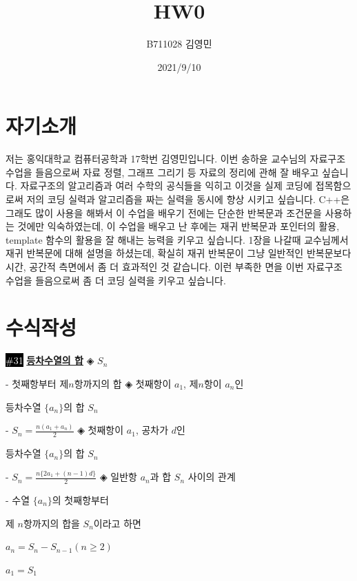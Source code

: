 \documentclass{article}
\title{HW0}
\author{B711028 김영민}
\date{2021/9/10}
\begin{document}
	
	\maketitle
	
\section{자기소개}

	저는 홍익대학교 컴퓨터공학과 17학번 김영민입니다. 이번 송하윤 교수님의 자료구조 수업을 들음으로써 자료 정렬, 그래프 그리기 등 자료의 정리에 관해 잘 배우고 싶습니다. 자료구조의 알고리즘과 여러 수학의 공식들을 익히고 이것을 실제 코딩에 접목함으로써 저의 코딩 실력과 알고리즘을 짜는 실력을 동시에 향상 시키고 싶습니다. C++은 그래도 많이 사용을 해봐서 이 수업을 배우기 전에는 단순한 반복문과 조건문을 사용하는 것에만 익숙하였는데, 이 수업을 배우고 난 후에는 재귀 반복문과 포인터의 활용, template 함수의 활용을 잘 해내는 능력을 키우고 싶습니다. 1장을 나갈때 교수님께서 재귀 반복문에 대해 설명을 하셨는데, 확실히 재귀 반복문이 그냥 일반적인 반복문보다 시간, 공간적 측면에서 좀 더 효과적인 것 같습니다. 이런 부족한 면을 이번 자료구조 수업을 들음으로써 좀 더 코딩 실력을 키우고 싶습니다.
	\vspace{2em}	
\section{수식작성}
	\colorbox{black}{\textcolor{white}{\#31}}  \underline{\textbf{등차수열의 합}}\newline
◈ $ S_n $
\vspace{0.1em}
\setlength{\parindent}{2ex}\par

- 첫째항부터 제$n$항까지의 합\newline
◈  첫째항이 $ a_1 $, 제$n$항이 $ a_n $인

\setlength{\parindent}{3ex}\par 등차수열 $\{ a_n\} $의 합 $ S_n $
\setlength{\parindent}{2ex}\par\vspace{0.1em}
- $S_n  = \frac{n(a_1 + a_n)}{2} $\newline
◈  첫째항이 $ a_1 $, 공차가 $ d $인

\setlength{\parindent}{3ex}\par 등차수열 $\{a_n\}$의 합 $S_n$
\setlength{\parindent}{2ex}\par\vspace{0.1em}
- $S_n  = \frac{n\{2a_1 + (n-1)d\}}{2} $\newline
◈  일반항 $a_n$과 합 $S_n$ 사이의 관계
\setlength{\parindent}{2ex}\par
- 수열 $\{a_n\}$의 첫째항부터
\setlength{\parindent}{3ex}\par
제 $n$항까지의 합을 $S_n$이라고 하면
\setlength{\parindent}{3ex}\par
$a_n = S_n - S_{n-1}(n\geq2)$
\setlength{\parindent}{3ex}\par
$a_1 = S_1$
\vspace{2em}
\end{document}
